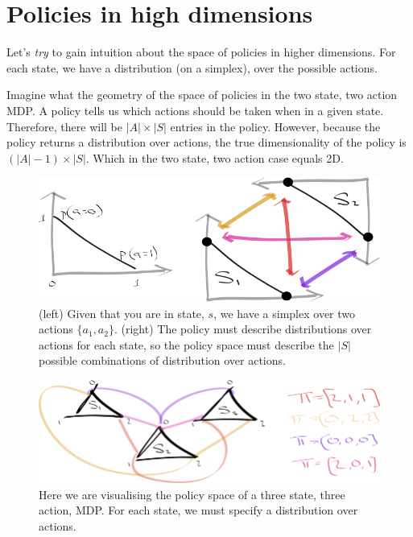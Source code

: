 \section{Policies in high dimensions}\label{high-D-policies}

Let's \textit{try} to gain intuition about the space of policies in higher dimensions.
For each state, we have a distribution (on a simplex), over the possible actions.

Imagine what the geometry of the space of policies in the two state, two action MDP. A policy tells us which actions should be taken when in a given state. Therefore, there will be \(|A| \times |S|\) entries in the policy. However, because the policy returns a distribution over actions, the true dimensionality of the policy is \((|A| -1) \times |S|\). Which in the two state, two action case equals 2D.

\begin{figure}[h]
\centering
\includegraphics[width=1\textwidth,height=0.20\textheight]{../../pictures/drawings/2-state-2-action-simplices.png}
\caption{(left) Given that you are in state, $s$, we have a simplex over two actions $\{a_1, a_2\}$.
(right) The policy must describe distributions over actions for each state,
so the policy space must describe the $|S|$ possible combinations of distribution over actions.}
\end{figure}

\begin{figure}[h]
\centering
\includegraphics[width=1\textwidth,height=0.25\textheight]{../../pictures/drawings/3-state-3-action-simplices.png}
\caption{Here we are visualising the policy space of a three state, three action, MDP.
For each state, we must specify a distribution over actions.}
\end{figure}

